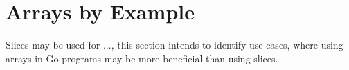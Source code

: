 \section{Arrays by Example}

Slices may be used for ..., this section intends to identify use cases, where
using arrays in Go programs may be more beneficial than using slices.

\begin{figure}
    
\end{figure}




















